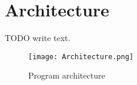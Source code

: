 \newpage
\section{Architecture}
TODO write text.

\begin{figure}[h!]
  \texttt{[image: Architecture.png]}
  \caption{Program architecture}
  \label{fig:Architecture}
\end{figure}